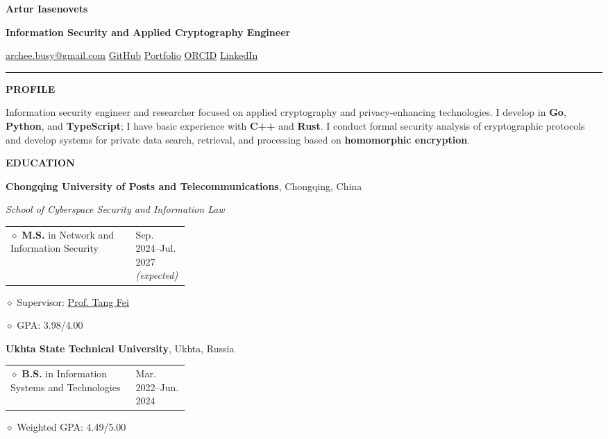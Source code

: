 \documentclass[11pt,a4paper]{article}
\makeatletter
\newcommand{\cvrow}[2]{%
  \noindent
  \begin{minipage}[t]{0.145\textwidth}
    \vspace{0pt}%
    \raggedright
    \fontsize{8.5}{10}\selectfont
    \bfseries\MakeUppercase{#1}
  \end{minipage}%
  \hfill
  \begin{minipage}[t]{0.835\textwidth}
    \vspace{0pt}%
    #2
  \end{minipage}\par
}
\newcommand{\eduentry}[2]{%
  \noindent
  \begin{tabularx}{\linewidth}
    {@{}X@{\hspace{0.8em}}
    >{\raggedleft\arraybackslash}p{0.30\linewidth}@{}}
    #1 & \small #2
  \end{tabularx}\par
  \vspace{0.15em}
}
\newcommand{\edudetail}[1]{%
  \noindent\hspace*{1.15em}$\diamond$ #1\par
}
\makeatother
\begin{document}
{\fontsize{24}{28}\selectfont\bfseries Artur Iasenovets}\par
\vspace{0.08em}
{\large\bfseries Information Security and Applied Cryptography Engineer}\par
\vspace{0.28em}
\href{mailto:archee.busy@gmail.com}{archee.busy@gmail.com}
\;\textbullet\;
\href{https://github.com/iasenovets}{GitHub}
\;\textbullet\;
\href{https://iasenovets.github.io/}{Portfolio}
\;\textbullet\;
\href{https://orcid.org/0009-0008-0008-3746}{ORCID}
\;\textbullet\;
\href{https://linkedin.com/in/iasenovets}{LinkedIn}
\par
\vspace{0.22em}
\hrule
\vspace{0.55em}

\cvrow{Profile}{%
  Information security engineer and researcher focused on applied cryptography
  and privacy-enhancing technologies. I develop in \textbf{Go},
  \textbf{Python}, and \textbf{TypeScript}; I have basic experience with
  \textbf{C++} and \textbf{Rust}. I conduct formal security analysis of
  cryptographic protocols and develop systems for private data search,
  retrieval, and processing based on \textbf{homomorphic encryption}.
}

\vspace{0.75em}

\cvrow{Education}{%
  \raggedright

  \textbf{Chongqing University of Posts and Telecommunications},
  Chongqing, China\par
  \textit{School of Cyberspace Security and Information Law}\par
  \vspace{0.12em}

  \eduentry
    {$\diamond$ \textbf{M.S.} in Network and Information Security}
    {Sep. 2024--Jul. 2027 \textit{(expected)}}

  \edudetail{Supervisor:
    \href{https://faculty.cqupt.edu.cn/tangfei/en/index.htm}{Prof. Tang Fei}}
  \edudetail{GPA: 3.98/4.00}

  \vspace{0.48em}

  \textbf{Ukhta State Technical University}, Ukhta, Russia\par
  \vspace{0.12em}

  \eduentry
    {$\diamond$ \textbf{B.S.} in Information Systems and Technologies}
    {Mar. 2022--Jun. 2024}

  \edudetail{Weighted GPA: 4.49/5.00}
}
\end{document}
